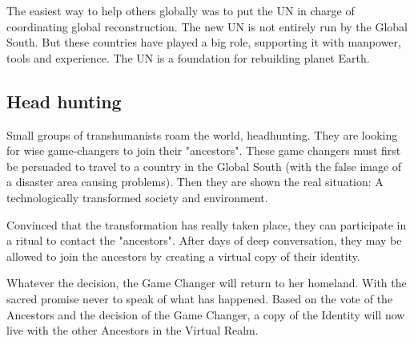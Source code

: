 The easiest way to help others globally was to put the UN in charge of coordinating global reconstruction. The new UN is not entirely run by the Global South. But these countries have played a big role, supporting it with manpower, tools and experience. The UN is a foundation for rebuilding planet Earth.

\subsection{Head hunting}

Small groups of transhumanists roam the world, headhunting. They are looking for wise game-changers to join their "ancestors". These game changers must first be persuaded to travel to a country in the Global South (with the false image of a disaster area causing problems).
Then they are shown the real situation: A technologically transformed society and environment.

Convinced that the transformation has really taken place, they can participate in a ritual to contact the "ancestors". After days of deep conversation, they may be allowed to join the ancestors by creating a virtual copy of their identity.

Whatever the decision, the Game Changer will return to her homeland. With the sacred promise never to speak of what has happened. Based on the vote of the Ancestors and the decision of the Game Changer, a copy of the Identity will now live with the other Ancestors in the Virtual Realm.







